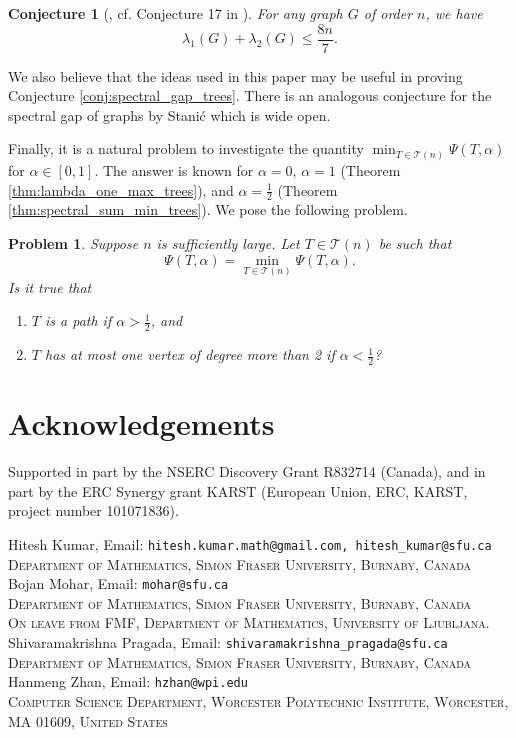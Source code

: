 \documentclass[11pt]{article}
\theoremstyle{plain}
\newtheorem{conjecture}[theorem]{Conjecture}
\newtheorem{problem}[theorem]{Problem}
\numberwithin{equation}{section}
\newcommand{\affl}[3]{\noindent #1, Email: {\tt #2}\\ \textsc{#3}\\[1.5pt]}
\begin{document}
\begin{conjecture}[\cite{Ebrahimi_Mohar_Nikiforov_Ahmady_2008}, cf. Conjecture 17 in \cite{Aouchiche_Hansen_2010}]\label{conj:spectral_sum} For any graph $G$ of order $n$, we have
    \[ \lambda_1(G)+\lambda_2(G)\le \frac{8n}{7}.\] 
\end{conjecture}

We also believe that the ideas used in this paper may be useful in proving Conjecture \ref{conj:spectral_gap_trees}. There is an analogous conjecture for the spectral gap of graphs by Stani\'{c} \cite{Stanic_2013} which is wide open.

Finally, it is a natural problem to investigate the quantity $\min_{T\in \mathcal{T}(n)} \Psi(T, \alpha)$ for $\alpha \in [0,1]$. The answer is known for $\alpha = 0$, $\alpha = 1$ (Theorem \ref{thm:lambda_one_max_trees}), and $\alpha = \frac{1}{2}$ (Theorem \ref{thm:spectral_sum_min_trees}). We pose the following problem.

\begin{problem} Suppose $n$ is sufficiently large. Let $T\in \mathcal{T}(n)$ be such that 
\[\Psi(T, \alpha) = \min_{T\in \mathcal{T}(n)} \Psi(T, \alpha).\] 
Is it true that 
\begin{enumerate}[$(i)$]
    \item $T$ is a path if $\alpha > \frac{1}{2}$, and
    \item $T$ has at most one vertex of degree more than 2 if $\alpha < \frac{1}{2}$?
\end{enumerate}
\end{problem}

\section*{Acknowledgements}

Supported in part by the NSERC Discovery Grant R832714 (Canada), and in part by the ERC Synergy grant KARST (European Union, ERC, KARST, project number 101071836).




\vspace{0.4cm}

\affl{Hitesh Kumar}{hitesh.kumar.math@gmail.com, hitesh\_kumar@sfu.ca}{Department of Mathematics, Simon Fraser University, Burnaby, Canada}

\affl{Bojan Mohar}{mohar@sfu.ca}{Department of Mathematics, Simon Fraser University, Burnaby, Canada\\On leave from FMF, Department of Mathematics, University of Ljubljana.}
 
\affl{Shivaramakrishna Pragada}{shivaramakrishna\_pragada@sfu.ca}{Department of Mathematics, Simon Fraser University, Burnaby, Canada}

\affl{Hanmeng Zhan}{hzhan@wpi.edu}{Computer Science Department, Worcester Polytechnic Institute, Worcester, MA 01609, United States}
\end{document}
